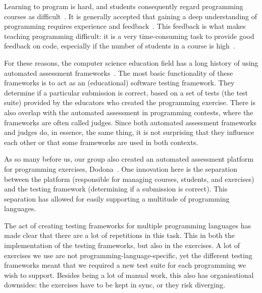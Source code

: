 \documentclass[./main]{subfiles}
\begin{document}
\label{ch:introduction}

Learning to program is hard, and students consequently regard programming courses as difficult~\autocite{robinsLearningTeachingProgramming2003,simoesNatureProgrammingExercises2020}.
It is generally accepted that gaining a deep understanding of programming requires experience and feedback~\autocite{gomesEnvironmentImproveProgramming2007}.
This feedback is what makes teaching programming difficult: it is a very time-consuming task to provide good feedback on code, especially if the number of students in a course is high~\autocite{zavalaUseSemanticbasedAIG2018,staubitzRepositoryOpenAutogradable2017,queirosPexilProgrammingExercises2011,pirttinenCrowdsourcingProgrammingAssignments2018,gulwaniFeedbackGenerationPerformance2014,tangDatadrivenTestCase2016}.

For these reasons, the computer science education field has a long history of using automated assessment frameworks~\autocite{ala-mutkaSurveyAutomatedAssessment2005,douceAutomaticTestbasedAssessment2005,ihantolaReviewRecentSystems2010,paivaAutomatedAssessmentComputer2022,combefisAutomatedCodeAssessment2022,nayakAutomatedAssessmentTools2022,messerAutomatedGradingFeedback2024}.
The most basic functionality of these frameworks is to act as an (educational) software testing framework.
They determine if a particular submission is correct, based on a set of tests (the test suite) provided by the educators who created the programming exercise.
There is also overlap with the automated assessment in programming contests, where the frameworks are often called judges.
Since both automated assessment frameworks and judges do, in essence, the same thing, it is not surprising that they influence each other or that some frameworks are used in both contexts.

As so many before us, our group also created an automated assessment platform for programming exercises, Dodona~\autocite{vanpetegemDodonaLearnCode2023}.
One innovation here is the separation between the platform (responsible for managing courses, students, and exercises) and the testing framework (determining if a submission is correct).
This separation has allowed for easily supporting a multitude of programming languages.

The act of creating testing frameworks for multiple programming languages has made clear that there are a lot of repetitions in this task.
This in both the implementation of the testing frameworks, but also in the exercises.
A lot of exercises we use are not programming-language-specific, yet the different testing frameworks meant that we required a new test suite for each programming we wish to support.
Besides being a lot of manual work, this also has organisational downsides: the exercises have to be kept in sync, or they risk diverging.
\end{document}
